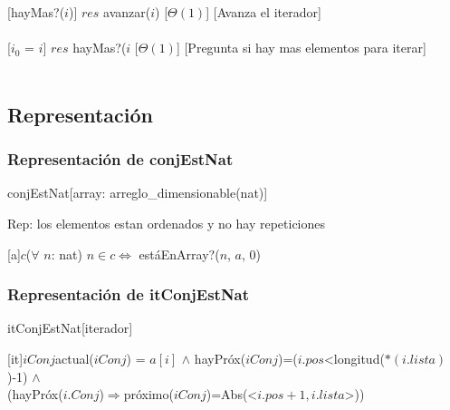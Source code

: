   [hayMas?($i$)]
  {$res$ \igobs avanzar($i$)}
  [$\Theta(1)$]
  [Avanza el iterador]\\\\
  
  [$i_{0}$ = $i$]
  {$res$ \igobs hayMas?($i$}
  [$\Theta(1)$]
  [Pregunta si hay mas elementos para iterar]\\\\
\subsection{Representaci\'on}
\subsubsection{Representaci\'on de conjEstNat}
\begin{Estructura}{conjEstNat}[array: arreglo\_dimensionable(nat)]\end{Estructura}
 	Rep: los elementos estan ordenados y no hay repeticiones
 	
 	[a]{$c$}{($\forall$ $n$: nat) $n \in c \Leftrightarrow$ est\'aEnArray?($n$, $a$, 0)}
 	
 	
\subsubsection{Representaci\'on de itConjEstNat}
\begin{Estructura}{itConjEstNat}[iterador]
	\begin{Tupla}[iterador]
	\end{Tupla}
\end{Estructura}

	
	[it]{$iConj$}{actual($iConj$) = $a[i]$ $\land$ hayPr\'ox($iConj$)=($i.pos$<longitud($*(i.lista)$)-1) $\land$ \\(hayPr\'ox($i.Conj$)$\Rightarrow$pr\'oximo($iConj$)=Abs(<$i.pos+1, i.lista$>))}
	
